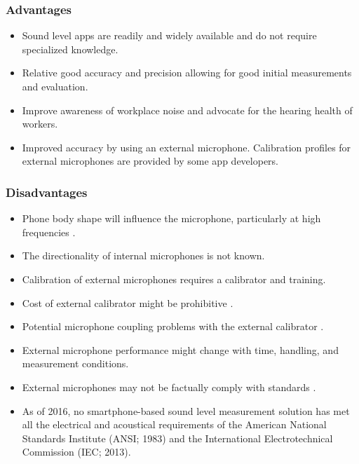 \vspace{-0.5cm}
\subsubsection*{Advantages}

\vspace{-0.3cm}
\begin{itemize}[itemsep=-0.15cm]
    \item Sound level apps are readily and widely available and do not require specialized knowledge.
    \item Relative good accuracy and precision allowing for good initial measurements and evaluation.
    \item Improve awareness of workplace noise and advocate for the hearing health of workers.
    \item Improved accuracy by using an external microphone.  Calibration profiles for external microphones are provided by some app developers.
\end{itemize}

\vspace{-0.6cm}
\subsubsection*{Disadvantages}

\vspace{-0.3cm}
\begin{itemize}[itemsep=-0.15cm]
    \item Phone body shape will influence the microphone, particularly at high frequencies \citep{faber_2017}.
    \item The directionality of internal microphones is not known.
    \item Calibration of external microphones requires a calibrator and training.
    \item Cost of external calibrator might be prohibitive \citep{kardous_and_shaw_2016}.
    \item Potential microphone coupling problems with the external calibrator \citep{kardous_and_shaw_2016}.
    \item External microphone performance might change with time, handling, and measurement conditions.
    \item External microphones may not be factually comply with standards \citep{kardous_and_shaw_2016}.
    \item As of 2016, no smartphone-based sound level measurement solution has met all the electrical and acoustical requirements of the American National Standards Institute (ANSI;  1983) and the International Electrotechnical Commission (IEC;  2013).
\end{itemize}





